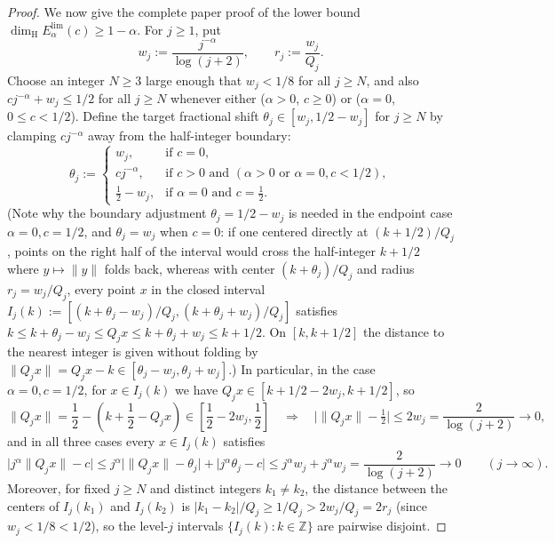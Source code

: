 \documentclass[11pt]{article}
\theoremstyle{definition}
\theoremstyle{remark}
\newcommand{\Z}{\mathbb{Z}}
\newcommand{\dimH}{\dim_{\mathrm{H}}}
\begin{document}
\begin{proof}
We now give the complete paper proof of the lower bound
$\dimH E_{\alpha}^{\mathrm{lim}}(c)\ge1-\alpha$. For $j\ge1$, put
\[
w_j:=\frac{j^{-\alpha}}{\log(j+2)},\qquad r_j:=\frac{w_j}{Q_j}.
\]
Choose an integer $N\ge3$ large enough that $w_j<1/8$ for all $j\ge N$, and
also $cj^{-\alpha}+w_j\le1/2$ for all $j\ge N$ whenever either ($\alpha>0$,
$c\ge0$) or ($\alpha=0$, $0\le c<1/2$). Define the target fractional shift
$\theta_j\in[w_j,1/2-w_j]$ for $j\ge N$ by clamping $cj^{-\alpha}$ away from the
half-integer boundary:
\[
\theta_j:=\begin{cases}
w_j,&\text{if }c=0,\\[2pt]
cj^{-\alpha},&\text{if }c>0\text{ and }(\alpha>0\text{ or }\alpha=0,c<1/2),\\[2pt]
\tfrac12-w_j,&\text{if }\alpha=0\text{ and }c=\tfrac12.
\end{cases}
\]
(Note why the boundary adjustment $\theta_j=1/2-w_j$ is needed in the endpoint
case $\alpha=0,c=1/2$, and $\theta_j=w_j$ when $c=0$: if one centered directly
at $(k+1/2)/Q_j$, points on the right half of the interval would cross the
half-integer $k+1/2$ where $y\mapsto\|y\|$ folds back, whereas with center
$(k+\theta_j)/Q_j$ and radius $r_j=w_j/Q_j$, every point $x$ in the closed
interval $I_j(k):=[(k+\theta_j-w_j)/Q_j,(k+\theta_j+w_j)/Q_j]$ satisfies
$k\le k+\theta_j-w_j\le Q_jx\le k+\theta_j+w_j\le k+1/2$. On $[k,k+1/2]$ the
distance to the nearest integer is given without folding by
$\|Q_jx\|=Q_jx-k\in[\theta_j-w_j,\theta_j+w_j]$.) In particular, in the case
$\alpha=0,c=1/2$, for $x\in I_j(k)$ we have
$Q_jx\in[k+1/2-2w_j,k+1/2]$, so
\[
\|Q_jx\|=\frac12-\left(k+\frac12-Q_jx\right)\in\left[\frac12-2w_j,\frac12\right]
\quad\Longrightarrow\quad
\bigl|\|Q_jx\|-\tfrac12\bigr|\le2w_j=\frac{2}{\log(j+2)}\longrightarrow0,
\]
and in all three cases every $x\in I_j(k)$ satisfies
\[
\bigl|j^\alpha\|Q_jx\|-c\bigr|
\le j^\alpha\bigl|\|Q_jx\|-\theta_j\bigr|+\bigl|j^\alpha\theta_j-c\bigr|
\le j^\alpha w_j+j^\alpha w_j=\frac{2}{\log(j+2)}\longrightarrow0
\qquad(j\to\infty).
\]
Moreover, for fixed $j\ge N$ and distinct integers $k_1\ne k_2$, the distance
between the centers of $I_j(k_1)$ and $I_j(k_2)$ is
$|k_1-k_2|/Q_j\ge1/Q_j>2w_j/Q_j=2r_j$ (since $w_j<1/8<1/2$), so the level-$j$
intervals $\{I_j(k):k\in\Z\}$ are pairwise disjoint.


\end{proof}
\end{document}
